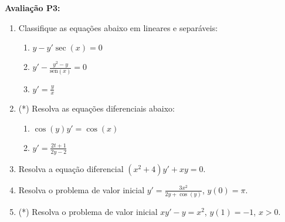 \documentclass{article}
\newcommand{\ds}{\displaystyle}
\newcommand{\sen}{\mbox{sen}}
\begin{document}
{\bf Avalia\c{c}\~ao P3:}
\begin{enumerate}
\item Classifique as equa\c{c}\~oes abaixo em lineares e separ\'aveis:
	\begin{enumerate}
		\item $\ds y - y' \sec(x) = 0$
		\item $\ds y' - \frac{y^2-y}{\sen(x)} = 0$
		\item $\ds y' = \frac{y}{x}$
	\end{enumerate}

\item (*) Resolva as equa\c{c}\~oes diferenciais abaixo:
	\begin{enumerate}
		\item $\ds \cos(y)y' = \cos(x)$
		\item $\ds y' = \frac{2t+1}{2y-2}$
	\end{enumerate}

\item Resolva a equa\c{c}\~ao diferencial $(x^2+4)y' + xy = 0$.

\item Resolva o problema de valor inicial $\ds y' = \frac{3x^2}{2y+\cos(y)}$, $y(0) = \pi$.

\item (*) Resolva o problema de valor inicial $xy'-y=x^2$, $y(1)=-1$, $x>0$.

\end{enumerate}
\end{document}
